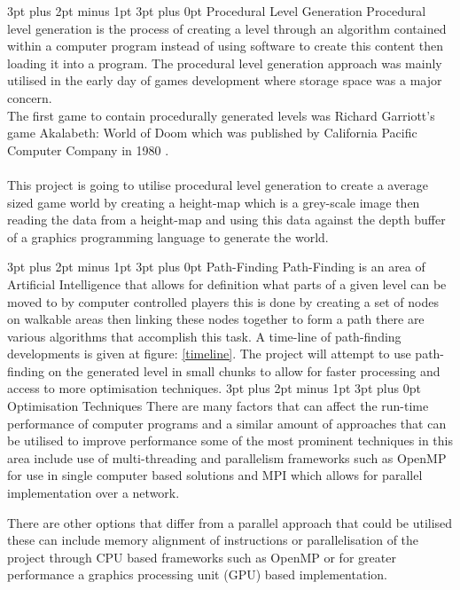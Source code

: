 \documentclass[12pt,a4paper]{article}
\makeatletter
\renewcommand\subsection{\@startsection {subsection}{1}{2mm} %
                               {3pt plus 2pt minus 1pt} %
                               {3pt plus 0pt} %
                               {\normalfont\bfseries}}
\makeatother
\begin{document}
\subsection{Procedural Level Generation}
Procedural level generation is the process of creating a level through an algorithm contained within a computer program instead of using software to create this content then loading it into a program. The procedural level generation approach was mainly utilised in the early day of games development where storage space was a major concern.\\The first game to contain procedurally generated levels was Richard Garriott's  game Akalabeth: World of Doom which was published by California Pacific Computer Company in 1980 \cite{Akalabeth}.\\\\This project is going to utilise procedural level generation to create a average sized game world by creating a height-map which is a grey-scale image then reading the data from a height-map and using this data against the depth buffer of a graphics programming language to generate the world.

\subsection{Path-Finding}
Path-Finding is an area of Artificial Intelligence that allows for definition what parts of a given level can be moved to by computer controlled players this is done by creating a set of nodes on walkable areas then linking these nodes together to form a path there are various algorithms that accomplish this task. A time-line of path-finding developments is given at figure: \ref{timeline}. The project will attempt to use path-finding on the generated level in small chunks to allow for faster processing and access to more optimisation techniques.  
\subsection{Optimisation Techniques}
There are many factors that can affect the run-time performance of computer programs and a similar amount of approaches that can be utilised to improve performance some of the most prominent techniques in this area include use of multi-threading and parallelism frameworks such as OpenMP for use in single computer based solutions and MPI which allows for parallel implementation over a network.

There are other options that differ from a parallel approach that could be utilised these can include memory alignment of instructions or parallelisation of the project through CPU based frameworks such as OpenMP or for greater performance a graphics processing unit (GPU) based implementation.      
\end{document}
